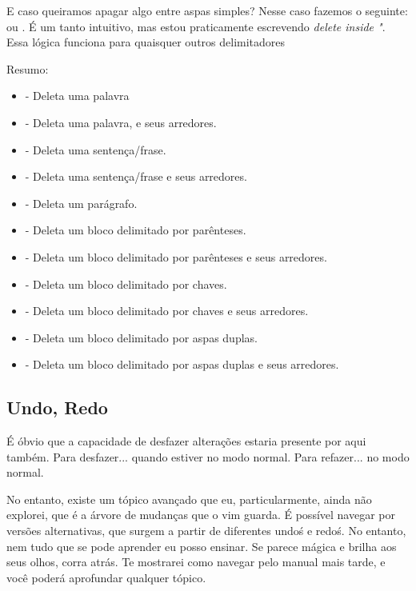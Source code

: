\documentclass[a4paper, 12pt]{article}
\begin{document}
E caso queiramos apagar algo entre aspas simples? Nesse caso fazemos o seguinte:
 ou .
É um tanto intuitivo, mas estou praticamente escrevendo \textit{delete inside "}.
Essa lógica funciona para quaisquer outros delimitadores

Resumo:
\begin{itemize}
    \item {} - Deleta uma palavra
    \item {} - Deleta uma palavra, e seus arredores.
    \item {} - Deleta uma sentença/frase.
    \item {} - Deleta uma sentença/frase e seus arredores.
    \item {} - Deleta um parágrafo.
    \item {} - Deleta um bloco delimitado por parênteses.
    \item {} - Deleta um bloco delimitado por parênteses e seus arredores.
    \item {} - Deleta um bloco delimitado por chaves.
    \item {} - Deleta um bloco delimitado por chaves e seus arredores.
    \item {} - Deleta um bloco delimitado por aspas duplas.
    \item {} - Deleta um bloco delimitado por aspas duplas e seus arredores.
\end{itemize}

\subsection{Undo, Redo}
É óbvio que a capacidade de desfazer alterações estaria presente por aqui também.
Para desfazer...  quando estiver no modo normal.
Para refazer...  no modo normal.

No entanto, existe um tópico avançado que eu, particularmente, ainda não explorei, que é a árvore de mudanças que o vim guarda.
É possível navegar por versões alternativas, que surgem a partir de diferentes undo\'s e redo\'s.
No entanto, nem tudo que se pode aprender eu posso ensinar.
Se parece mágica e brilha aos seus olhos, corra atrás.
Te mostrarei como navegar pelo manual mais tarde, e você poderá aprofundar qualquer tópico.
\end{document}
